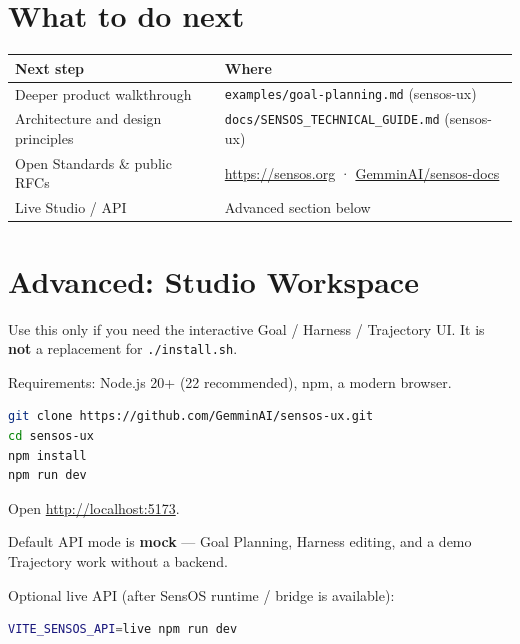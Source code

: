\documentclass[11pt,a4paper,oneside]{article}
\newcommand{\pathcode}[1]{\texttt{#1}}
\begin{document}
\section{What to do next}
\label{sec:next}

\begin{center}
\begin{tabularx}{\textwidth}{@{}Y L@{}}
\toprule
\textbf{Next step} & \textbf{Where} \\
\midrule
Deeper product walkthrough & \texttt{examples/goal-planning.md} (sensos-ux) \\
Architecture and design principles & \texttt{docs/SENSOS\_TECHNICAL\_GUIDE.md} (sensos-ux) \\
Open Standards \& public RFCs & \url{https://sensos.org} · \href{https://github.com/GemminAI/sensos-docs}{GemminAI/sensos-docs} \\
Live Studio / API & Advanced section below \\
\bottomrule
\end{tabularx}
\end{center}

\section{Advanced: Studio Workspace}
\label{sec:advanced}

\begin{advancedbox}
Use this only if you need the interactive Goal / Harness / Trajectory UI. It is \textbf{not} a replacement for \pathcode{./install.sh}.
\end{advancedbox}

Requirements: Node.js 20+ (22 recommended), npm, a modern browser.

\begin{lstlisting}[language=bash]
git clone https://github.com/GemminAI/sensos-ux.git
cd sensos-ux
npm install
npm run dev
\end{lstlisting}

Open \url{http://localhost:5173}.

Default API mode is \textbf{mock} — Goal Planning, Harness editing, and a demo Trajectory work without a backend.

Optional live API (after SensOS runtime / bridge is available):

\begin{lstlisting}[language=bash]
VITE_SENSOS_API=live npm run dev
\end{lstlisting}
\end{document}
